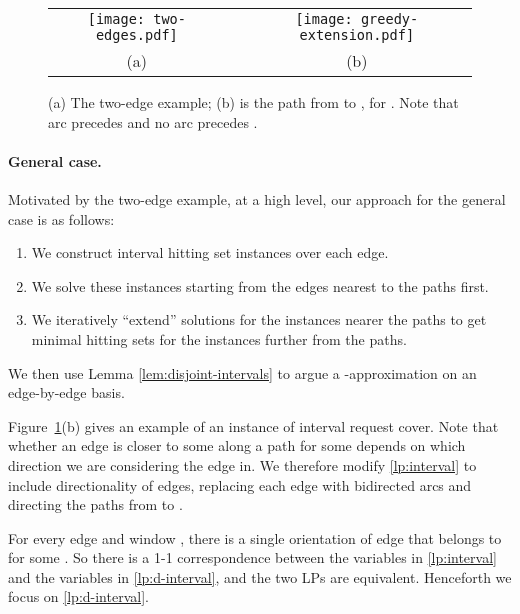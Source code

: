 \begin{figure}
\begin{center}
\begin{tabular}{ccc}
\texttt{[image: two-edges.pdf]}
& \hspace{1 in}  & 
\texttt{[image: greedy-extension.pdf]}\\
(a) & \hspace{1 in}  &   (b)\\
\end{tabular}
\end{center}
\caption{(a) The two-edge example; (b)  is the path from  to , for . Note that arc  precedes  and no arc precedes .}   
\label{fig:examples}
\end{figure}

\paragraph{General case.} 


Motivated by the two-edge example, at a high level, our approach for
the general case is as follows:
\begin{enumerate}
\item We construct interval hitting set instances over each edge.
\item We solve these instances starting from the edges nearest to the
  paths  first.
\item We iteratively ``extend'' solutions for the instances nearer the
  paths to get minimal hitting sets for the instances further from
  the paths.
\end{enumerate}
We then use Lemma \ref{lem:disjoint-intervals} to argue a -approximation
on an edge-by-edge basis.









Figure~\ref{fig:examples}(b) gives an example of an instance of
interval request cover. Note that whether an edge is closer to some
 along a path  for some  depends on which direction we
are considering the edge in. We therefore modify \eqref{lp:interval}
to include directionality of edges, replacing each edge  with
bidirected arcs and directing the paths  from  to .




For every edge  and window , there is a single orientation of
edge  that belongs to  for some . So there is a 1-1
correspondence between the variables  in \eqref{lp:interval}
and the variables  in \eqref{lp:d-interval}, and the two LPs are
equivalent. Henceforth we focus on \eqref{lp:d-interval}.



